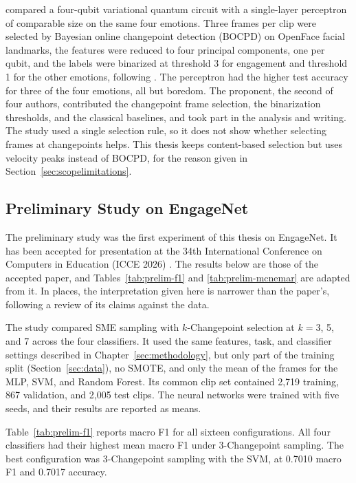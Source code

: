  compared a four-qubit variational quantum circuit with a single-layer perceptron of comparable size on the same four emotions. Three frames per clip were selected by Bayesian online changepoint detection (BOCPD) \cite{adams2007} on OpenFace facial landmarks, the features were reduced to four principal components, one per qubit, and the labels were binarized at threshold 3 for engagement and threshold 1 for the other emotions, following . The perceptron had the higher test accuracy for three of the four emotions, all but boredom. The proponent, the second of four authors, contributed the changepoint frame selection, the binarization thresholds, and the classical baselines, and took part in the analysis and writing. The study used a single selection rule, so it does not show whether selecting frames at changepoints helps. This thesis keeps content-based selection but uses velocity peaks instead of BOCPD, for the reason given in Section~\ref{sec:scopelimitations}.

\subsection{Preliminary Study on EngageNet}
\label{sec:prelim}

The preliminary study was the first experiment of this thesis on EngageNet. It has been accepted for presentation at the 34th International Conference on Computers in Education (ICCE 2026) \cite{sityar2026icce}. The results below are those of the accepted paper, and Tables~\ref{tab:prelim-f1} and \ref{tab:prelim-mcnemar} are adapted from it. In places, the interpretation given here is narrower than the paper's, following a review of its claims against the data.

The study compared SME sampling with $k$-Changepoint selection at $k = 3$, 5, and 7 across the four classifiers. It used the same features, task, and classifier settings described in Chapter~\ref{sec:methodology}, but only part of the training split (Section~\ref{sec:data}), no SMOTE, and only the mean of the frames for the MLP, SVM, and Random Forest. Its common clip set contained 2,719 training, 867 validation, and 2,005 test clips. The neural networks were trained with five seeds, and their results are reported as means.

Table~\ref{tab:prelim-f1} reports macro F1 for all sixteen configurations. All four classifiers had their highest mean macro F1 under 3-Changepoint sampling. The best configuration was 3-Changepoint sampling with the SVM, at 0.7010 macro F1 and 0.7017 accuracy.

